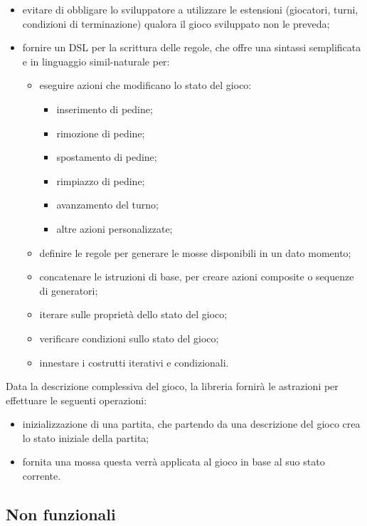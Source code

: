 \begin{itemize}
\begin{itemize}
    \end{itemize}
    \item evitare di obbligare lo sviluppatore a utilizzare le estensioni (giocatori, turni, condizioni di terminazione) qualora il gioco sviluppato non le preveda;
    \item fornire un DSL per la scrittura delle regole, che offre una sintassi semplificata e in linguaggio simil-naturale per:
    \begin{itemize}
        \item eseguire azioni che modificano lo stato del gioco:
        \begin{itemize}
            \item inserimento di pedine;
            \item rimozione di pedine;
            \item spostamento di pedine;
            \item rimpiazzo di pedine;
            \item avanzamento del turno;
            \item altre azioni personalizzate;
        \end{itemize}
        \item definire le regole per generare le mosse disponibili in un dato momento;
        \item concatenare le istruzioni di base, per creare azioni composite o sequenze di generatori;
        \item iterare sulle proprietà dello stato del gioco;
        \item verificare condizioni sullo stato del gioco;
        \item innestare i costrutti iterativi e condizionali.
    \end{itemize}
\end{itemize}
%
Data la descrizione complessiva del gioco, la libreria fornirà le astrazioni per effettuare le seguenti operazioni:
%
\begin{itemize}
    \item inizializzazione di una partita, che partendo da una descrizione del gioco crea lo stato iniziale della partita;
    \item fornita una mossa questa verrà applicata al gioco in base al suo stato corrente.
\end{itemize}

\subsection{Non funzionali}

